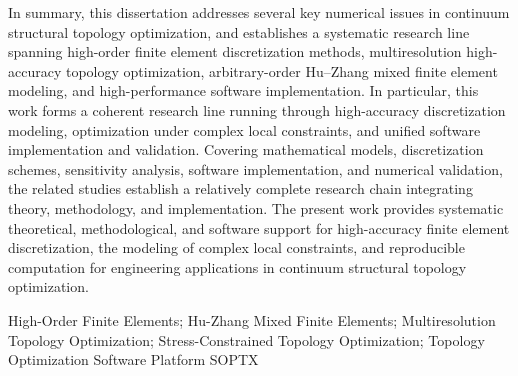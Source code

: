 \begin{enabstract}
	In summary, this dissertation addresses several key numerical issues in continuum structural topology optimization, and establishes a systematic research line spanning high-order finite element discretization methods, multiresolution high-accuracy topology optimization, arbitrary-order Hu–Zhang mixed finite element modeling, and high-performance software implementation. In particular, this work forms a coherent research line running through high-accuracy discretization modeling, optimization under complex local constraints, and unified software implementation and validation. Covering mathematical models, discretization schemes, sensitivity analysis, software implementation, and numerical validation, the related studies establish a relatively complete research chain integrating theory, methodology, and implementation. The present work provides systematic theoretical, methodological, and software support for high-accuracy finite element discretization, the modeling of complex local constraints, and reproducible computation for engineering applications in continuum structural topology optimization.
	
\end{enabstract}

\begin{enkeywords}
	High-Order Finite Elements; Hu-Zhang Mixed Finite Elements; Multiresolution Topology Optimization; Stress-Constrained Topology Optimization; Topology Optimization Software Platform SOPTX
\end{enkeywords}